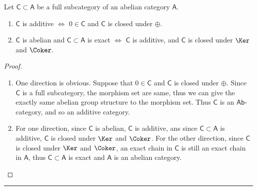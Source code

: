 \begin{lemma} Let $\mathsf{C}\subset \mathsf{A}$ be a full subcategory of an abelian category $\mathsf{A}$.
\begin{enumerate}
\item $\mathsf{C}$ is additive $\Leftrightarrow$ $0\in \mathsf{C}$ and $\mathsf{C}$ is closed under $\oplus$.
\item $\mathsf{C}$ is abelian and $\mathsf{C}\subset \mathsf{A}$ is exact $\Leftrightarrow$ $\mathsf{C}$ is additive, and $\mathsf{C}$ is closed under $\Ker$ and $\Coker$. 
\end{enumerate}
\end{lemma}
\begin{proof}
\begin{enumerate}
\item One direction is obvious. Suppose that $0\in\mathsf{C}$ and $\mathsf{C}$ is closed under $\oplus$. Since $\mathsf{C}$ is a full subcategory, the morphism set are same, thus we can give the exactly same abelian group structure to the morphism set. Thus $\mathsf{C}$ is an $\mathsf{Ab}$-category, and so an additive category.
\item For one direction, since $\mathsf{C}$ is abelian, $\mathsf{C}$ is additive, ans since $\mathsf{C}\subset \mathsf{A}$ is additive, $\mathsf{C}$ is closed under $\Ker$ and $\Coker$. For the other direction, since $\mathsf{C}$ is closed under $\Ker$ and $\Coker$, an exact chain in $\mathsf{C}$ is still an exact chain in $\mathsf{A}$, thus $\mathsf{C}\subset \mathsf{A}$ is exact and $\mathsf{A}$ is an abelian category.
\end{enumerate}
\end{proof}
\noindent\rule{\textwidth}{1pt}
\newline